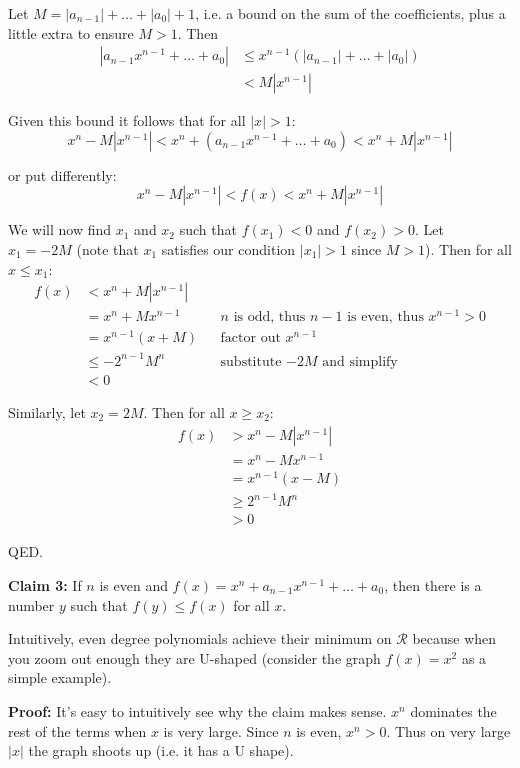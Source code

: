 Let $M=|a_{n-1}|+\ldots+|a_0|+1$, i.e. a bound on the sum of the
coefficients, plus a little extra to ensure $M>1$. Then
\begin{align*}
  |a_{n-1}x^{n-1}+\ldots+a_{0}| &\leq x^{n-1}(|a_{n-1}|+\ldots+|a_0|)\\
                           &< M|x^{n-1}|
\end{align*}

Given this bound it follows that for all $|x|>1$:
\[x^{n}-M|x^{n-1}|<x^{n}+(a_{n-1}x^{n-1}+\ldots+a_{0})<x^{n}+M|x^{n-1}|\]

or put differently:
\[x^{n}-M|x^{n-1}|<f(x)<x^{n}+M|x^{n-1}|\]

We will now find $x_1$ and $x_2$ such that $f(x_1)<0$ and $f(x_2)>0$.
Let $x_1=-2M$ (note that $x_1$ satisfies our condition $|x_1|>1$ since
$M>1$). Then for all $x\leq x_1$:
\begin{align*}
  f(x)&<x^{n}+M|x^{n-1}|\\
      &=x^n+Mx^{n-1}&&n \text{ is odd, thus } n-1\text{ is even, thus } x^{n-1}>0\\
      &=x^{n-1}(x+M)&&\text{factor out } x^{n-1}\\
      &\leq -2^{n-1}M^n&&\text{substitute $-2M$ and simplify}\\
      &<0
\end{align*}

Similarly, let $x_2=2M$. Then for all $x\geq x_2$:
\begin{align*}
  f(x)&>x^{n}-M|x^{n-1}|\\
      &=x^n-Mx^{n-1}\\
      &=x^{n-1}(x-M)\\
      &\geq 2^{n-1}M^n\\
      &>0
\end{align*}

QED.

\vs

\textbf{Claim 3:} If $n$ is even and
$f(x)=x^{n}+a_{n-1}x^{n-1}+\ldots+a_{0}$, then there is a number $y$ such
that $f(y)\leq f(x)$ for all $x$.

\vs

Intuitively, even degree polynomials achieve their minimum on
$\mathcal{R}$ because when you zoom out enough they are U-shaped (consider the
graph $f(x)=x^2$ as a simple example).

\vs

\textbf{Proof:} It's easy to intuitively see why the claim makes
sense. $x^n$ dominates the rest of the terms when $x$ is very large.
Since $n$ is even, $x^n>0$. Thus on very large $|x|$ the graph shoots
up (i.e. it has a U shape).

